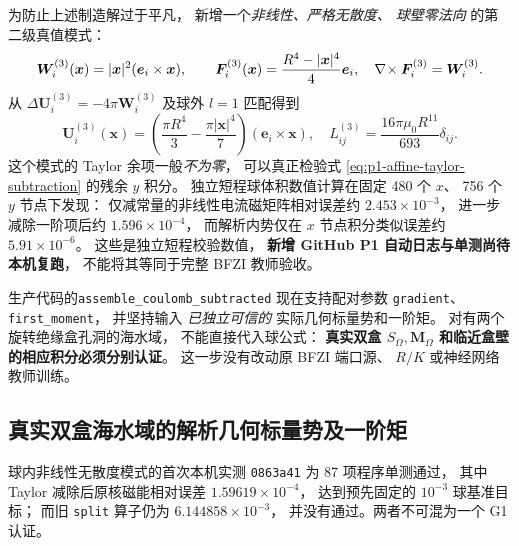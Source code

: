 为防止上述制造解过于平凡，
新增一个\emph{非线性、严格无散度、
球壁零法向} 的第二级真值模式：
\[
\bm W_i^{(3)}(\bm x)
=|\bm x|^2(\bm e_i\times\bm x),\qquad
\bm F_i^{(3)}(\bm x)
=\frac{R^4-|\bm x|^4}{4}\bm e_i ,
\quad \nabla\!\times\bm F_i^{(3)}=\bm W_i^{(3)} .
\]
从 $\Delta\bm U_i^{(3)}=-4\pi\bm W_i^{(3)}$
及球外 $l=1$ 匹配得到
\begin{equation}
\boxed{\bm U_i^{(3)}(\bm x)
=\left(\frac{\pi R^4}{3}
-\frac{\pi|\bm x|^4}{7}\right)
(\bm e_i\times\bm x),\quad
L_{ij}^{(3)}=\frac{16\pi\mu_0 R^{11}}{693}\delta_{ij}.}
\label{eq:p1-cubic-vortex-exact}
\end{equation}
这个模式的 Taylor 余项一般\emph{不为零}，
可以真正检验式
\eqref{eq:p1-affine-taylor-subtraction}
的残余 $y$ 积分。
独立短程球体积数值计算在固定 480 个 $x$、
756 个 $y$ 节点下发现：
仅减常量的非线性电流磁矩阵相对误差约
$2.453\times10^{-3}$，
进一步减除一阶项后约
$1.596\times10^{-4}$，
而解析内势仅在 $x$ 节点积分类似误差约
$5.91\times10^{-6}$。
这些是独立短程校验数值，
\textbf{新增 GitHub P1 自动日志与单测尚待本机复跑}，
不能将其等同于完整 BFZI 教师验收。

生产代码的\texttt{assemble\_coulomb\_subtracted}
现在支持配对参数
\texttt{gradient}、\texttt{first\_moment}，
并坚持输入 \emph{已独立可信的}
实际几何标量势和一阶矩。
对有两个旋转绝缘盒孔洞的海水域，
不能直接代入球公式：
\textbf{真实双盒 $S_\Omega,\bm M_\Omega$
和临近盒壁的相应积分必须分别认证}。
这一步没有改动原 BFZI 端口源、
$R/K$ 或神经网络教师训练。


\subsection{真实双盒海水域的解析几何标量势及一阶矩}
球内非线性无散度模式的首次本机实测
\texttt{0863a41} 为 87 项程序单测通过，
其中 Taylor 减除后原核磁能相对误差
$1.59619\times10^{-4}$，
达到预先固定的 $10^{-3}$ 球基准目标；
而旧 \texttt{split} 算子仍为
$6.144858\times10^{-3}$，
并没有通过。两者不可混为一个 G1 认证。

